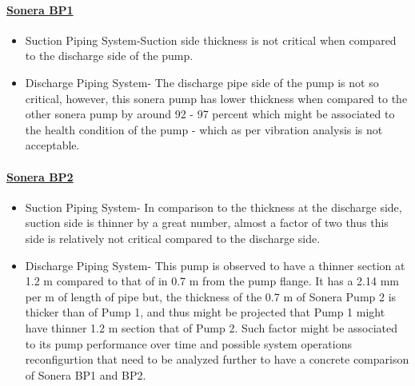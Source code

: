 \paragraph{\underline{Sonera BP1}}
\begin{itemize}
\item Suction Piping System-Suction side thickness is not critical when compared to the discharge side of the pump.

\item Discharge Piping System- The discharge pipe side of the pump is not so critical, however,  this sonera pump has lower thickness when compared to the other sonera pump by around 92 - 97 percent which might be associated to the health condition of the pump - which as per vibration analysis is not acceptable.

\end{itemize}

\paragraph{\underline{Sonera BP2}}
\begin{itemize}
\item Suction Piping System- In comparison to the thickness at the discharge side, suction side is thinner by a great number, almost a factor of two thus this side is relatively not critical compared to the discharge side.


\item Discharge Piping System- This pump is observed to have a thinner section at 1.2 m compared to that of in 0.7 m from the pump flange. It has a 2.14 mm per m of length of pipe but, the thickness of the 0.7 m of Sonera Pump 2 is thicker than of Pump 1, and thus might be projected that Pump 1 might have thinner 1.2 m section that of Pump 2. Such factor might be associated to its pump performance over time and possible system operations reconfigurtion that need to be analyzed further to have a concrete comparison of Sonera BP1 and BP2.

\end{itemize}

